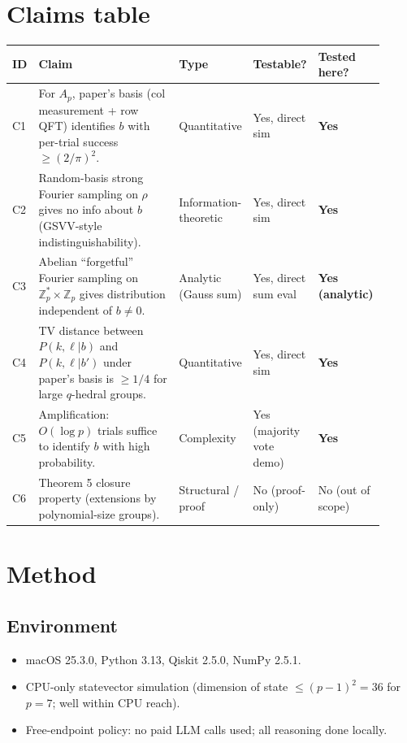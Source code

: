 \documentclass[11pt]{article}
\begin{document}
\section{Claims table}
\begin{center}
\small
\begin{tabular}{@{}p{0.05\linewidth} p{0.42\linewidth} p{0.14\linewidth} p{0.14\linewidth} p{0.16\linewidth}@{}}
\toprule
ID & Claim & Type & Testable? & Tested here? \\
\midrule
C1 & For $A_p$, paper's basis (col measurement + row QFT) identifies $b$ with per-trial success $\ge (2/\pi)^{2}$. & Quantitative & Yes, direct sim & \textbf{Yes} \\
C2 & Random-basis strong Fourier sampling on $\rho$ gives no info about $b$ (GSVV-style indistinguishability). & Information-theoretic & Yes, direct sim & \textbf{Yes} \\
C3 & Abelian ``forgetful'' Fourier sampling on $\mathbb{Z}_p^{*}\times\mathbb{Z}_p$ gives distribution independent of $b\ne0$. & Analytic (Gauss sum) & Yes, direct sum eval & \textbf{Yes (analytic)} \\
C4 & TV distance between $P(k,\ell|b)$ and $P(k,\ell|b')$ under paper's basis is $\ge 1/4$ for large $q$-hedral groups. & Quantitative & Yes, direct sim & \textbf{Yes} \\
C5 & Amplification: $O(\log p)$ trials suffice to identify $b$ with high probability. & Complexity & Yes (majority vote demo) & \textbf{Yes} \\
C6 & Theorem 5 closure property (extensions by polynomial-size groups). & Structural / proof & No (proof-only) & No (out of scope) \\
\bottomrule
\end{tabular}
\end{center}

\section{Method}

\subsection{Environment}
\begin{itemize}
\item macOS 25.3.0, Python 3.13, Qiskit 2.5.0, NumPy 2.5.1.
\item CPU-only statevector simulation (dimension of state $\le (p-1)^{2}=36$
for $p=7$; well within CPU reach).
\item Free-endpoint policy: no paid LLM calls used; all reasoning done locally.
\end{itemize}
\end{document}

